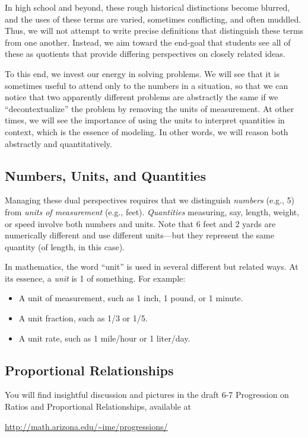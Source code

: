 In high school and beyond, these rough historical distinctions become blurred, and the uses of these terms are varied, sometimes conflicting, and often muddled.  Thus, we will not attempt to write precise definitions that distinguish these terms from one another.  Instead, we aim toward the end-goal that students see all of these as quotients that provide differing perspectives on closely related ideas.  

To this end, we invest our energy in solving problems.  We will see that it is sometimes useful to attend only to the numbers in a situation, so that we can notice that two apparently different problems are abstractly the same if we ``decontextualize'' the problem by removing the units of measurement.  At other times, we will see the importance of using the units to interpret quantities in context, which is the essence of modeling.  In other words, we will reason both abstractly and quantitatively.

\subsection{Numbers, Units, and Quantities}
Managing these dual perspectives requires that we distinguish \emph{numbers} (e.g., 5) from \emph{units of measurement} (e.g., feet). \emph{Quantities} measuring, say, length, weight, or speed involve both numbers and units.  Note that 6 feet and 2 yards are numerically different and use different units---but they represent the same quantity (of length, in this case).  

\begin{warning}
In mathematics, the word ``unit'' is used in several different but related ways.  At its essence, a \emph{unit} is 1 of something.  For example:  
\begin{itemize}
\item A unit of measurement, such as 1 inch, 1 pound, or 1 minute.  
\item A unit fraction, such as 1/3 or 1/5.  
\item A unit rate, such as 1 mile/hour or 1 liter/day.  
\end{itemize}
\end{warning}


\subsection{Proportional Relationships}
\begin{teachingnote}
You will find insightful discussion and pictures in the draft 6-7 Progression on Ratios and Proportional Relationships, available at 

\url{http://math.arizona.edu/~ime/progressions/}
\end{teachingnote}

